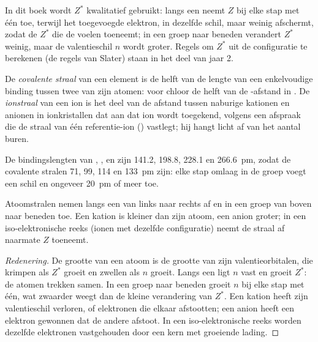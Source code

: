 \begin{remark}\label{rem:b1:periodicity:slater}
In dit boek wordt $Z^{*}$ kwalitatief gebruikt: langs een  neemt
$Z$ bij elke stap met één toe, terwijl het toegevoegde elektron, in
dezelfde schil, maar weinig afschermt, zodat de $Z^{*}$ die de
 voelen toeneemt; in een groep naar beneden verandert
$Z^{*}$ weinig, maar de valentieschil $n$ wordt groter. Regels om
$Z^{*}$ uit de configuratie te berekenen (de regels van Slater) staan in
het deel van jaar 2.
\end{remark}

\begin{definition}\label{def:b1:periodicity:radius}
De \emph{covalente straal} van een element is de
helft van de lengte van een enkelvoudige binding tussen twee van zijn
atomen: voor chloor de helft van de -afstand in . De
\emph{ionstraal} van een ion is het deel van de afstand
tussen naburige kationen en anionen in ionkristallen dat aan dat ion
wordt toegekend, volgens een afspraak die de straal van één
referentie-ion () vastlegt; hij hangt licht af van het aantal
buren.
\end{definition}

\begin{example}[De halogenen]\label{ex:b1:periodicity:halogen-radii}
De bindingslengten van , ,  en  zijn 141.2,
198.8, 228.1 en \qty{266.6}{pm}, zodat de covalente stralen 71, 99, 114
en \qty{133}{pm} zijn: elke stap omlaag in de groep voegt een schil en
ongeveer \qty{20}{pm} of meer toe.
\end{example}


\begin{proposition}\label{prop:b1:periodicity:radius-trend}
Atoomstralen nemen langs een  van links naar rechts af en in een
groep van boven naar beneden toe. Een kation is kleiner dan zijn atoom,
een anion groter; in een iso-elektronische reeks (ionen met dezelfde
configuratie) neemt de straal af naarmate $Z$ toeneemt.
\end{proposition}

\begin{proof}[Redenering]
De grootte van een atoom is de grootte van zijn valentieorbitalen, die
krimpen als $Z^{*}$ groeit en zwellen als $n$ groeit. Langs een 
ligt $n$ vast en groeit $Z^{*}$: de atomen trekken samen. In een groep
naar beneden groeit $n$ bij elke stap met één, wat zwaarder weegt dan de
kleine verandering van $Z^{*}$. Een kation heeft zijn valentieschil
verloren, of elektronen die elkaar afstootten; een anion heeft een
elektron gewonnen dat de andere afstoot. In een iso-elektronische reeks
worden dezelfde elektronen vastgehouden door een kern met groeiende
lading.
\end{proof}

